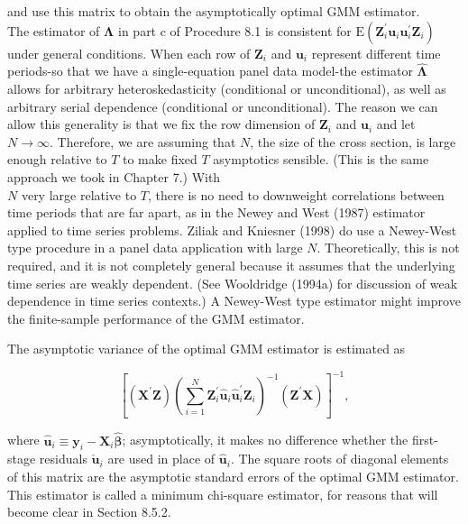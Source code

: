 \documentclass[10pt]{article}
\begin{document}
and use this matrix to obtain the asymptotically optimal GMM estimator.\\
The estimator of $\boldsymbol{\Lambda}$ in part c of Procedure 8.1 is consistent for $\mathrm{E}\left(\mathbf{Z}_{i}^{\prime} \mathbf{u}_{i} \mathbf{u}_{i}^{\prime} \mathbf{Z}_{i}\right)$ under general conditions. When each row of $\mathbf{Z}_{i}$ and $\mathbf{u}_{i}$ represent different time periods-so that we have a single-equation panel data model-the estimator $\hat{\boldsymbol{\Lambda}}$ allows for arbitrary heteroskedasticity (conditional or unconditional), as well as arbitrary serial dependence (conditional or unconditional). The reason we can allow this generality is that we fix the row dimension of $\mathbf{Z}_{i}$ and $\mathbf{u}_{i}$ and let $N \rightarrow \infty$. Therefore, we are assuming that $N$, the size of the cross section, is large enough relative to $T$ to make fixed $T$ asymptotics sensible. (This is the same approach we took in Chapter 7.) With\\
$N$ very large relative to $T$, there is no need to downweight correlations between time periods that are far apart, as in the Newey and West (1987) estimator applied to time series problems. Ziliak and Kniesner (1998) do use a Newey-West type procedure in a panel data application with large $N$. Theoretically, this is not required, and it is not completely general because it assumes that the underlying time series are weakly dependent. (See Wooldridge (1994a) for discussion of weak dependence in time series contexts.) A Newey-West type estimator might improve the finite-sample performance of the GMM estimator.

The asymptotic variance of the optimal GMM estimator is estimated as


\begin{equation*}
\left[\left(\mathbf{X}^{\prime} \mathbf{Z}\right)\left(\sum_{i=1}^{N} \mathbf{Z}_{i}^{\prime} \hat{\mathbf{u}}_{i} \hat{\mathbf{u}}_{i}^{\prime} \mathbf{Z}_{i}\right)^{-1}\left(\mathbf{Z}^{\prime} \mathbf{X}\right)\right]^{-1}, \tag{8.37}
\end{equation*}


where $\hat{\mathbf{u}}_{i} \equiv \mathbf{y}_{i}-\mathbf{X}_{i} \hat{\boldsymbol{\beta}}$; asymptotically, it makes no difference whether the first-stage residuals $\check{\mathbf{u}}_{i}$ are used in place of $\hat{\mathbf{u}}_{i}$. The square roots of diagonal elements of this matrix are the asymptotic standard errors of the optimal GMM estimator. This estimator is called a minimum chi-square estimator, for reasons that will become clear in Section 8.5.2.
\end{document}

